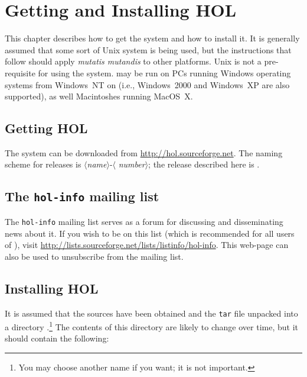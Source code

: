 \chapter{Getting and Installing HOL}
\label{install}

This chapter describes how to get the \HOL{} system and how to install
it.  It is generally assumed that some sort of Unix system is being
used, but the instructions that follow should apply {\it mutatis
  mutandis\/} to other platforms.  Unix is not a pre-requisite for
using the system. \HOL{} may be run on PCs running Windows operating
systems from Windows~NT on (i.e., Windows~2000 and Windows~XP are also
supported), as well Macintoshes running MacOS~X.

\section{Getting HOL}

The \HOL{} system can be downloaded from
\url{http://hol.sourceforge.net}.  The naming scheme for \holn{}
releases is $\langle${\it name}$\rangle$-$\langle${\it
  number}$\rangle$; the release described here is \holnversion.

\section{The {\tt hol-info} mailing list}

The \texttt{hol-info} mailing list serves as a forum for discussing
\HOL{} and disseminating news about it.  If you wish to be on this
list (which is recommended for all users of \HOL), visit
\url{http://lists.sourceforge.net/lists/listinfo/hol-info}.  This
web-page can also be used to unsubscribe from the mailing list.

\section{Installing HOL}

It is assumed that the \HOL{} sources have been obtained and the
\texttt{tar} file unpacked into a directory .\footnote{You may
  choose another name if you want; it is not important.} The contents
of this directory are likely to change over time, but it should
contain the following:


